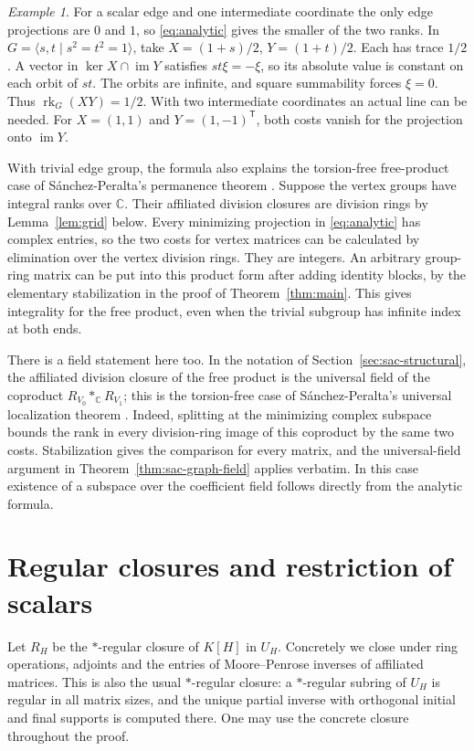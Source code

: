 \documentclass[11pt,a4paper,reqno]{amsart}
\numberwithin{equation}{section}
\theoremstyle{remark}
\newtheorem*{example}{Example}
\newcommand{\C}{\mathbb C}
\newcommand{\rk}{\operatorname{rk}}
\newcommand{\im}{\operatorname{im}}
\begin{document}
\begin{example}
For a scalar edge and one intermediate coordinate the only edge projections are \(0\) and \(1\), so \eqref{eq:analytic} gives the smaller of the two ranks. In \(G=\langle s,t\mid s^2=t^2=1\rangle\), take \(X=(1+s)/2\), \(Y=(1+t)/2\). Each has trace \(1/2\). A vector in \(\ker X\cap\im Y\) satisfies \(st\xi=-\xi\), so its absolute value is constant on each orbit of \(st\). The orbits are infinite, and square summability forces \(\xi=0\). Thus \(\rk_G(XY)=1/2\). With two intermediate coordinates an actual line can be needed. For \(X=(1,1)\) and \(Y=(1,-1)^{\mathsf T}\), both costs vanish for the projection onto \(\im Y\).
\end{example}

With trivial edge group, the formula also explains the torsion-free free-product case of S\'anchez-Peralta's permanence theorem \cite[Theorem~1.1]{Sanchez}. Suppose the vertex groups have integral ranks over \(\C\). Their affiliated division closures are division rings by Lemma~\ref{lem:grid} below. Every minimizing projection in \eqref{eq:analytic} has complex entries, so the two costs for vertex matrices can be calculated by elimination over the vertex division rings. They are integers. An arbitrary group-ring matrix can be put into this product form after adding identity blocks, by the elementary stabilization in the proof of Theorem~\ref{thm:main}. This gives integrality for the free product, even when the trivial subgroup has infinite index at both ends.

There is a field statement here too. In the notation of Section~\ref{sec:sac-structural}, the affiliated division closure of the free product is the universal field of the coproduct \(R_{V_0}*_{\C}R_{V_1}\); this is the torsion-free case of S\'anchez-Peralta's universal localization theorem \cite[Theorems~1.2(iii) and~3.8]{Sanchez}. Indeed, splitting at the minimizing complex subspace bounds the rank in every division-ring image of this coproduct by the same two costs. Stabilization gives the comparison for every matrix, and the universal-field argument in Theorem~\ref{thm:sac-graph-field} applies verbatim. In this case existence of a subspace over the coefficient field follows directly from the analytic formula.

\section{Regular closures and restriction of scalars}
Let \(R_H\) be the \(*\)-regular closure of \(K[H]\) in \(U_H\). Concretely we close under ring operations, adjoints and the entries of Moore--Penrose inverses of affiliated matrices. This is also the usual \(*\)-regular closure: a \(*\)-regular subring of \(U_H\) is regular in all matrix sizes, and the unique partial inverse with orthogonal initial and final supports is computed there. One may use the concrete closure throughout the proof.
\end{document}
